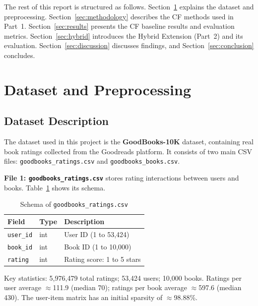 \documentclass[12pt, a4paper]{article}
\begin{document}
The rest of this report is structured as follows.
Section~\ref{sec:dataset} explains the dataset and preprocessing.
Section~\ref{sec:methodology} describes the CF methods used in Part~1.
Section~\ref{sec:results} presents the CF baseline results and evaluation metrics.
Section~\ref{sec:hybrid} introduces the Hybrid Extension (Part~2) and its evaluation.
Section~\ref{sec:discussion} discusses findings, and Section~\ref{sec:conclusion} concludes.

\newpage
\section{Dataset and Preprocessing}
\label{sec:dataset}

\subsection{Dataset Description}

The dataset used in this project is the \textbf{GoodBooks-10K} dataset,
containing real book ratings collected from the Goodreads platform.
It consists of two main CSV files: \texttt{goodbooks\_ratings.csv} and \texttt{goodbooks\_books.csv}.

\textbf{File 1: \texttt{goodbooks\_ratings.csv}} stores rating interactions between users and books.
Table~\ref{tab:ratings_schema} shows its schema.

\begin{table}[H]
  \centering
  \caption{Schema of \texttt{goodbooks\_ratings.csv}}
  \label{tab:ratings_schema}
  \begin{tabular}{|l|l|l|}
    \hline
    \textbf{Field}   & \textbf{Type} & \textbf{Description} \\
    \hline
    \texttt{user\_id}  & int & User ID (1 to 53,424) \\
    \hline
    \texttt{book\_id}  & int & Book ID (1 to 10,000) \\
    \hline
    \texttt{rating}    & int & Rating score: 1 to 5 stars \\
    \hline
  \end{tabular}
\end{table}

Key statistics: 5,976,479 total ratings; 53,424 users; 10,000 books.
Ratings per user average $\approx$111.9 (median 70);
ratings per book average $\approx$597.6 (median 430).
The user-item matrix has an initial sparsity of $\approx$98.88\%.
\end{document}
